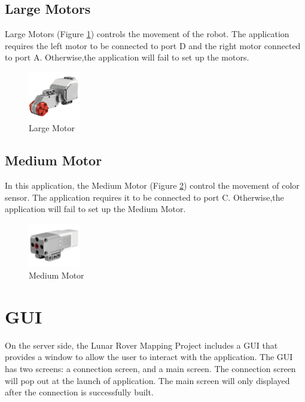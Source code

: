 \documentclass[12pt,a4paper]{article}
\begin{document}
\subsection{Large Motors}
Large Motors (Figure \ref{large motor}) controls the movement of the robot. The application requires the left motor to be connected to port D and the right motor connected to port A. Otherwise,the application will fail to set up the motors.
\begin{figure}[!htb]
\centering
\includegraphics[width=0.2\textwidth]{LargeMotor.png}
\caption{Large Motor}
\label{large motor}
\end{figure}

\subsection{Medium Motor} 
In this application, the Medium Motor (Figure \ref{medium motor}) control the movement of color sensor. The application requires it to be connected to port C. Otherwise,the application will fail to set up the Medium Motor.
\begin{figure}[!htb]
\centering
\includegraphics[width=0.2\textwidth]{MediumMotor.png}
\caption{Medium Motor}
\label{medium motor}
\end{figure}

\newpage
\section{GUI}
On the server side, the Lunar Rover Mapping Project includes a GUI that provides a window to allow the user to interact with the application. The GUI has two screens: a connection screen, and a main screen. The connection screen will pop out at the launch of application. The main screen will only displayed after the connection is successfully built.
\end{document}
